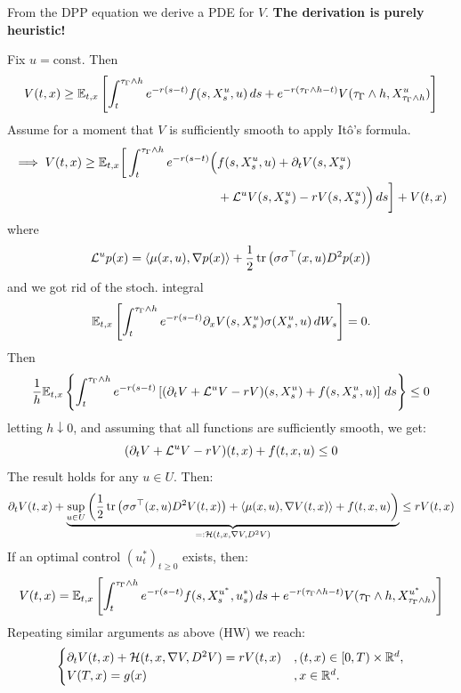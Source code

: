 \begin{remark}
    From the DPP equation we derive a PDE for $V$. \textbf{\color{orange}The derivation is purely heuristic!}
    
    Fix $u = \text{const}$. Then 
    \[ V(t,x) \geq \mathbb E_{t,x} \left[ \int_t^{\tau_\Gamma \wedge h} e^{-r(s-t)} f(s, X_s^u, u) \, ds + e^{-r(\tau_\Gamma \wedge h - t)} V(\tau_\Gamma \wedge h, X_{\tau_\Gamma \wedge h}^u) \right] \]
    Assume for a moment that $V$ is sufficiently smooth to apply Itô's formula.
    \begin{align*}
        \implies V(t,x) \geq \mathbb E_{t,x} \bigg[ \int_t^{\tau_\Gamma \wedge h} e^{-r(s-t)} \Big( &f(s, X_s^u, u) + \partial_t V(s, X_s^u) \\
        &+ \mathcal{L}^u V(s, X_s^u) - r V(s, X_s^u) \Big) \, ds \bigg] + V(t,x)
    \end{align*}
    where
    \[ \mathcal{L}^u p(x) = \langle \mu(x,u), \nabla p(x) \rangle + \frac{1}{2} \operatorname{tr} \left(\sigma \sigma^\top(x,u) D^2 p(x)\right) \]
    and we got rid of the stoch. integral
    \[ \mathbb E_{t,x} \left[ \int_t^{\tau_\Gamma \wedge h} e^{-r(s-t)} \partial_x V(s, X_s^u) \sigma(X_s^u, u) \, dW_s \right] = 0. \]
    Then
    \[ \frac{1}{h} \mathbb E_{t,x} \left\{ \int_t^{\tau_\Gamma \wedge h} e^{-r(s-t)} \left[ (\partial_t V + \mathcal{L}^u V - r V)(s, X_s^u) + f(s, X_s^u, u) \right] \, ds \right\} \leq 0 \]
    letting $h \downarrow 0$, and assuming that all functions are sufficiently smooth, we get:
    \[ (\partial_t V + \mathcal{L}^u V - r V)(t,x) + f(t,x,u) \leq 0 \]
    The result holds for any $u \in U$. Then:
    \[ \partial_t V(t,x) + \underbrace{\sup_{u \in U} \left(\frac{1}{2} \operatorname{tr} \left(\sigma \sigma^\top(x,u) D^2 V(t,x)\right) + \langle \mu(x,u), \nabla V(t,x) \rangle + f(t,x,u)\right)}_{=: \mathcal{H}(t, x, \nabla V, D^2 V)} \leq r V(t,x) \]
    If an optimal control $(u_t^*)_{t \geq 0}$ exists, then:
    \[ V(t,x) = \mathbb E_{t,x} \left[ \int_t^{\tau_\Gamma \wedge h} e^{-r(s-t)} f(s, X_s^{u^*}, u_s^*) \, ds + e^{-r(\tau_\Gamma \wedge h - t)} V(\tau_\Gamma \wedge h, X_{\tau_\Gamma \wedge h}^{u^*}) \right] \]
    Repeating similar arguments as above (HW) we reach:
    \begin{equation*}
        \begin{cases} 
            \partial_t V(t,x) + \mathcal{H}(t, x, \nabla V, D^2 V) = r V(t,x) & , (t,x) \in [0,T) \times \mathbb R^d, \\ 
            V(T,x) = g(x) & , x \in \mathbb R^d. 
        \end{cases}
    \end{equation*}
\end{remark}

